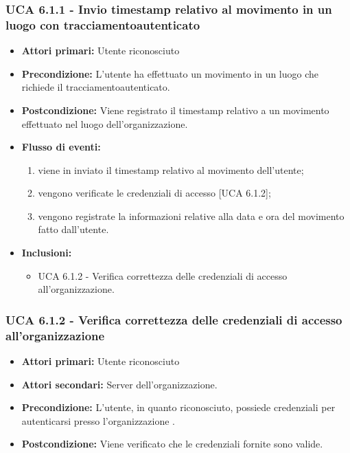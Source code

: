 \subsubsection{UCA 6.1.1 - Invio timestamp relativo al movimento in un luogo con tracciamentoautenticato}
\begin{itemize}
	\item \textbf{Attori primari:} Utente riconosciuto
	\item \textbf{Precondizione:} L'utente ha effettuato un movimento in un luogo che richiede il tracciamentoautenticato.
	\item \textbf{Postcondizione:} Viene registrato il timestamp relativo a un movimento effettuato nel luogo dell'organizzazione.
	\item \textbf{Flusso di eventi:}
		\begin{enumerate}
			\item viene in inviato il timestamp relativo al movimento dell'utente;
			\item vengono verificate le credenziali di accesso [UCA 6.1.2];
			\item vengono registrate la informazioni relative alla data e ora del movimento fatto dall'utente.
		\end{enumerate}
	\item \textbf{Inclusioni:}
		\begin{itemize}
			\item UCA 6.1.2 - Verifica correttezza delle credenziali di accesso all'organizzazione.
		\end{itemize}
\end{itemize}

\subsubsection{UCA 6.1.2 - Verifica correttezza delle credenziali di accesso all'organizzazione}
\begin{itemize}
	\item \textbf{Attori primari:} Utente riconosciuto
	\item \textbf{Attori secondari:} Server dell'organizzazione.
	\item \textbf{Precondizione:} L'utente, in quanto riconosciuto, possiede credenziali per autenticarsi presso l'organizzazione .
	\item \textbf{Postcondizione:} Viene verificato che le credenziali fornite sono valide.
\end{itemize}

